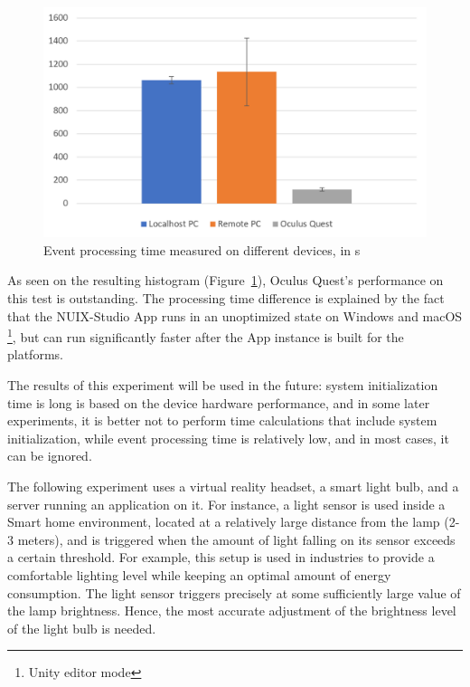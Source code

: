\begin{figure}
  \centering
  \includegraphics[width = 0.9 \linewidth]{figures/EventProcessingTime.png}
  \caption{Event processing time measured on different devices, in \textmu{}s}
  \label{fig:EventProcessingTime-figure}
\end{figure}

As seen on the resulting histogram (Figure~\ref{fig:EventProcessingTime-figure}), Oculus Quest's performance on this test is outstanding. The processing time difference is explained by the fact that the NUIX-Studio App runs in an unoptimized state on Windows and macOS \footnote{Unity editor mode}, but can run significantly faster after the App instance is built for the platforms.

The results of this experiment will be used in the future: system initialization time is long is based on the device hardware performance, and in some later experiments, it is better not to perform time calculations that include system initialization, while event processing time is relatively low, and in most cases, it can be ignored.

The following experiment uses a virtual reality headset, a smart light bulb, and a server running an application on it. For instance, a light sensor is used inside a Smart home environment, located at a relatively large distance from the lamp (2-3 meters), and is triggered when the amount of light falling on its sensor exceeds a certain threshold. For example, this setup is used in industries to provide a comfortable lighting level while keeping an optimal amount of energy consumption. The light sensor triggers precisely at some sufficiently large value of the lamp brightness. Hence, the most accurate adjustment of the brightness level of the light bulb is needed.

